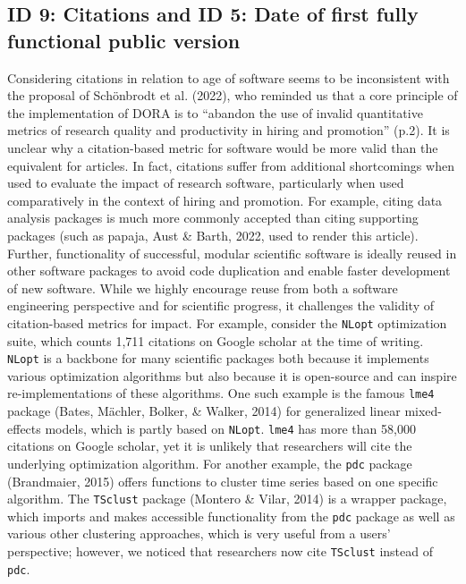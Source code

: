 \documentclass[
  man]{apa6}
\begin{document}
\hypertarget{id-9-citations-and-id-5-date-of-first-fully-functional-public-version}{%
\subsection{ID 9: Citations and ID 5: Date of first fully functional public version}\label{id-9-citations-and-id-5-date-of-first-fully-functional-public-version}}

Considering citations in relation to age of software seems to be inconsistent with the proposal of Schönbrodt et al. (2022), who reminded us that a core principle of the implementation of DORA is to ``abandon the use of invalid quantitative metrics of research quality and productivity in hiring and promotion'' (p.2).
It is unclear why a citation-based metric for software would be more valid than the equivalent for articles.
In fact, citations suffer from additional shortcomings when used to evaluate the impact of research software, particularly when used comparatively in the context of hiring and promotion.
For example, citing data analysis packages is much more commonly accepted than citing supporting packages (such as papaja, Aust \& Barth, 2022, used to render this article).
Further, functionality of successful, modular scientific software is ideally reused in other software packages to avoid code duplication and enable faster development of new software.
While we highly encourage reuse from both a software engineering perspective and for scientific progress, it challenges the validity of citation-based metrics for impact.
For example, consider the \texttt{NLopt} optimization suite, which counts 1,711 citations on Google scholar at the time of writing.
\texttt{NLopt} is a backbone for many scientific packages both because it implements various optimization algorithms but also because it is open-source and can inspire re-implementations of these algorithms.
One such example is the famous \texttt{lme4} package (Bates, Mächler, Bolker, \& Walker, 2014) for generalized linear mixed-effects models, which is partly based on \texttt{NLopt}.
\texttt{lme4} has more than 58,000 citations on Google scholar, yet it is unlikely that researchers will cite the underlying optimization algorithm.
For another example, the \texttt{pdc} package (Brandmaier, 2015) offers functions to cluster time series based on one specific algorithm.
The \texttt{TSclust} package (Montero \& Vilar, 2014) is a wrapper package, which imports and makes accessible functionality from the \texttt{pdc} package as well as various other clustering approaches, which is very useful from a users' perspective; however, we noticed that researchers now cite \texttt{TSclust} instead of \texttt{pdc}.
\end{document}
